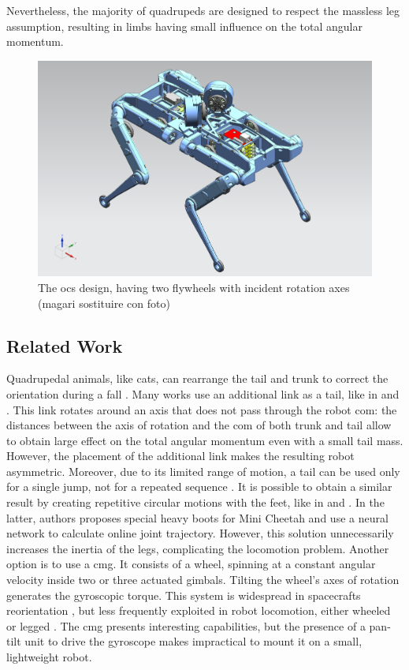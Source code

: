 \documentclass[letterpaper, 10 pt, conference]{ieeeconf}  %
\begin{document}
Nevertheless, the majority of quadrupeds are designed to respect the massless leg assumption, resulting in limbs having small influence on the total angular momentum.

\begin{figure}[t!]
	\centering
	\includegraphics[width=.7\linewidth]{figures/solo_flywheels.png}
	\caption{\small The \gls{ocs} design, having two flywheels with incident rotation axes (magari sostituire con foto)}
	\label{fig:solo12flywheels}
\end{figure} 
\subsection{Related Work}
Quadrupedal animals, like cats, can rearrange the tail and trunk to correct the orientation during a fall \cite{kane1969dynamical}.
Many works use an additional link as a tail, like in \cite{chu2019null} and \cite{wenger2016frontal}.
This link rotates around an axis that does not pass through the robot \gls{com}: the distances between the axis of rotation and the \gls{com} of both trunk and tail allow to obtain large effect on the total angular momentum even with a small tail mass.
However, the placement of the additional link makes the resulting robot asymmetric. Moreover, due to its limited range of motion, a tail can be used only for a single jump, not for a repeated sequence \cite{johnson2012tail}.
It is possible to obtain a similar result by creating repetitive circular motions with the feet, like in \cite{hoffman2021exploiting} and \cite{kurtz2021mini}. In the latter, authors proposes special heavy boots for Mini Cheetah and use a neural network to calculate online joint trajectory. However, this solution unnecessarily increases the inertia of the legs, complicating the locomotion problem. 
Another option is to use a \gls{cmg}.
It consists of a wheel, spinning at a constant angular velocity inside two or three actuated gimbals.
Tilting the wheel's axes of rotation generates the gyroscopic torque.
This system is widespread in spacecrafts reorientation \cite{yoon2002spacecraft}, but less frequently exploited in robot locomotion, either wheeled \cite{brown1996single} or legged \cite{mikhalkov2021gyrubot}.
The \gls{cmg} presents interesting capabilities, but the presence of a pan-tilt unit to drive the gyroscope makes impractical to mount it on a small, lightweight robot.
\end{document}
